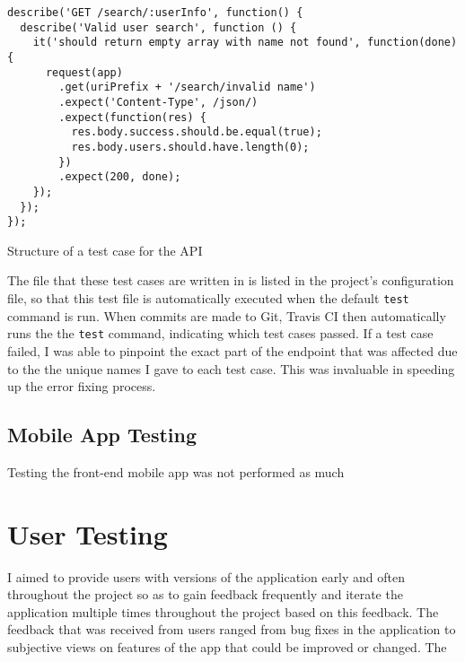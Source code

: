 \begin{listing}
  \centering
  \begin{lstlisting}[style=json]
describe('GET /search/:userInfo', function() {
  describe('Valid user search', function () {
    it('should return empty array with name not found', function(done) {
      request(app)
        .get(uriPrefix + '/search/invalid name')
        .expect('Content-Type', /json/)
        .expect(function(res) {
          res.body.success.should.be.equal(true);
          res.body.users.should.have.length(0);
        })
        .expect(200, done);
    });
  });
});
  \end{lstlisting}
  \caption{Structure of a test case for the API}
  \label{listing:api-test}
\end{listing}


The file that these test cases are written in is listed in the project's configuration file, so that this test file is automatically executed when the default \verb|test| command is run. When commits are made to Git, Travis CI then automatically runs the the \verb|test| command, indicating which test cases passed. If a test case failed, I was able to pinpoint the exact part of the endpoint that was affected due to the the unique names I gave to each test case. This was invaluable in speeding up the error fixing process.

\subsection{Mobile App Testing}

Testing the front-end mobile app was not performed as much

\section{User Testing}

I aimed to provide users with versions of the application early and often throughout the project so as to gain feedback frequently and iterate the application multiple times throughout the project based on this feedback. The feedback that was received from users ranged from bug fixes in the application to subjective views on features of the app that could be improved or changed. The 

